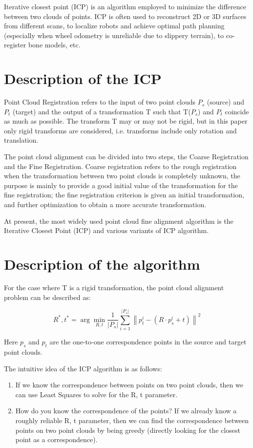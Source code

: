 \documentclass{article}
\begin{document}
Iterative closest point (ICP) is an algorithm employed to minimize the difference between two clouds of points. ICP is often used to reconstruct 2D or 3D surfaces from different scans, to localize robots and achieve optimal path planning (especially when wheel odometry is unreliable due to slippery terrain), to co-register bone models, etc.
\section{Description of the ICP}
Point Cloud Registration refers to the input of two point clouds $P_s$ (source) and $P_t$ (target) and the output of a transformation T such that T($P_s$) and $P_t$ coincide as much as possible. The transform T may or may not be rigid, but in this paper only rigid transforms are considered, i.e. transforms include only rotation and translation.

The point cloud alignment can be divided into two steps, the Coarse Registration and the Fine Registration. Coarse registration refers to the rough registration when the transformation between two point clouds is completely unknown, the purpose is mainly to provide a good initial value of the transformation for the fine registration; the fine registration criterion is given an initial transformation, and further optimization to obtain a more accurate transformation.

At present, the most widely used point cloud fine alignment algorithm is the Iterative Closest Point (ICP) and various variants of ICP algorithm.

\section{Description of the algorithm}
For the case where T is a rigid transformation, the point cloud alignment problem can be described as:

\begin{equation}
	R^{*}, t^{*}=\arg \min _{R, t}  \frac{1}{\left|P_{s}\right|} \sum_{i=1}^{\mid P_{s}|}\left\|p_{t}^{i}-\left(R \cdot p_{s}^{i}+t\right)\right\|^{2}
\end{equation}

Here $p_s$ and $p_t$ are the one-to-one correspondence points in the source and target point clouds.

The intuitive idea of the ICP algorithm is as follows:
\begin{enumerate}
	\item If we know the correspondence between points on two point clouds, then we can use Least Squares to solve for the R, t parameter.
	\item How do you know the correspondence of the points? If we already know a roughly reliable R, t parameter, then we can find the correspondence between points on two point clouds by being greedy (directly looking for the closest point as a correspondence).
\end{enumerate}
\end{document}
